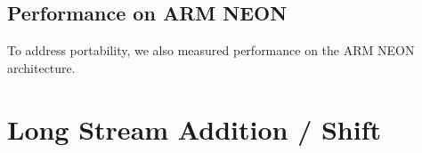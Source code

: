 \subsection{Performance on ARM NEON}
To address portability, we also measured performance on the ARM NEON architecture.

\section{Long Stream Addition / Shift}

